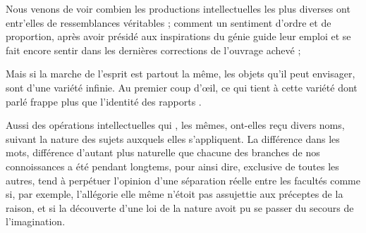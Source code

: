 \documentclass[11pt,a4paper]{article}
\begin{document}
Nous venons de voir combien les productions intellectuelles les plus diverses
ont entr'elles de ressemblances véritables ;  comment un sentiment
d'ordre et de proportion, après avoir présidé aux inspirations du génie guide
leur emploi et se fait encore sentir dans les dernières corrections de
l'ouvrage achevé ; 



Mais si la  marche de l'esprit  est partout la
même,  les objets   qu'il  peut envisager, sont d'une variété
 infinie.  Au premier coup d'œil,  ce qui
tient à  \ill{} cette variété dont 
parlé frappe   plus que l'identité des
rapports .


Aussi des opérations intellectuelles qui 
, les mêmes, ont-elles reçu  divers noms,
 suivant  la nature des sujets
auxquels elles s'appliquent.  La différence dans les mots,
différence d'autant plus naturelle que chacune des branches de nos
connoissances  a été pendant longtems, pour ainsi dire, exclusive
 de toutes les autres, tend à perpétuer l'opinion d'une
séparation réelle entre les facultés   comme si, par exemple, l'allégorie elle même n'étoit pas assujettie aux
préceptes de la raison, et si la découverte d'une loi de la nature avoit pu se
passer du secours de l'imagination.
\end{document}
